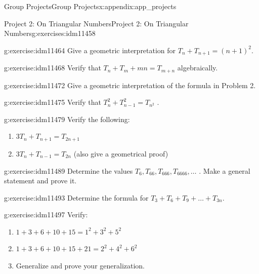\documentclass[oneside,10pt,]{book}
\numberwithin{equation}{chapter}
\begin{document}
\begin{appendixptx}{Group Projects}{}{Group Projects}{}{}{x:appendix:app_projects}
\begin{exercises-section-numberless}{Project 2: On Triangular Numbers}{}{Project 2: On Triangular Numbers}{}{}{g:exercises:idm11458}
\begin{divisionexercise}{1}{}{}{g:exercise:idm11464}
Give a geometric interpretation for \(T_{n} + T_{n + 1} = \left( n + 1 \right)^{2}.\)%
\end{divisionexercise}%
\begin{divisionexercise}{2}{}{}{g:exercise:idm11468}%
Verify that \(T_{n} + T_{m} + mn = T_{m + n}\) algebraically.%
\end{divisionexercise}%
\begin{divisionexercise}{3}{}{}{g:exercise:idm11472}%
Give a geometric interpretation of the formula in Problem 2.%
\end{divisionexercise}%
\begin{divisionexercise}{4}{}{}{g:exercise:idm11475}%
Verify that \(T_{n}^{2} + T_{n - 1}^{2} = T_{n^{2}}\) .%
\end{divisionexercise}%
\begin{divisionexercise}{5}{}{}{g:exercise:idm11479}%
Verify the following:%
\begin{enumerate}[label=(\alph*)]
\item{}\(3T_{n} + T_{n + 1} = T_{2n + 1}\)%
\item{}\(3T_{n} + T_{n - 1} = T_{2n}\) (also give a geometrical proof)%
\end{enumerate}
%
\end{divisionexercise}%
\begin{divisionexercise}{6}{}{}{g:exercise:idm11489}%
Determine the values \(T_{6},T_{66},T_{666},T_{6666},\ldots\) . Make a general statement and prove it.%
\end{divisionexercise}%
\begin{divisionexercise}{7}{}{}{g:exercise:idm11493}%
Determine the formula for \(T_{3} + T_{6} + T_{9} + \ldots + T_{3n}.\)%
\end{divisionexercise}%
\begin{divisionexercise}{8}{}{}{g:exercise:idm11497}%
Verify:%
\begin{enumerate}[label=(\alph*)]
\item{}\(1 + 3 + 6 + 10 + 15 = 1^{2} + 3^{2} + 5^{2}\)%
\item{}\(1 + 3 + 6 + 10 + 15 + 21 = 2^{2} + 4^{2} + 6^{2}\)%
\item{}Generalize and prove your generalization.%
\end{enumerate}
%
\end{divisionexercise}%
\end{exercises-section-numberless}
%
%
\typeout{************************************************}
\typeout{************************************************}

\end{appendixptx}
\end{document}
